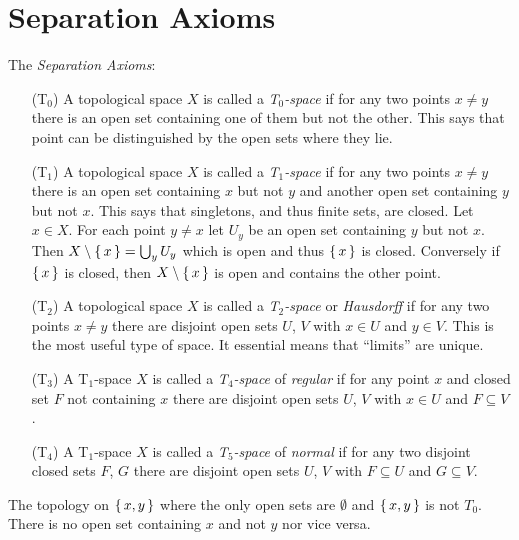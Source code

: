 \documentclass[letterpaper, 11pt]{article}
\begin{document}
\clearpage

\section{Separation Axioms}

\begin{defn}
  The \emph{Separation Axioms}:
  \begin{itemize}
  \item[(T$_{0}$)] A topological space $X$ is called a \emph{T$_{0}$-space} if for any two points $x \neq y$ there is an open set containing one of them but not the other.
                   This says that point can be distinguished by the open sets where they lie.
  \item[(T$_{1}$)] A topological space $X$ is called a \emph{T$_{1}$-space} if for any two points $x \neq y$ there is an open set containing $x$ but not $y$ and another open set containing $y$ but not $x$.
        This says that singletons, and thus finite sets, are closed.
        Let $x \in X$.
        For each point $y \neq x$ let $U_{y}$ be an open set containing $y$ but not $x$.
        Then $X \setminus \set{x} = \bigcup_{y} U_{y}$ which is open and thus $\set{x}$ is closed.
        Conversely if $\set{x}$ is closed, then $X \setminus \set{x}$ is open and contains the other point.
  \item[(T$_{2}$)] A topological space $X$ is called a \emph{T$_{2}$-space} or \emph{Hausdorff} if for any two points $x \neq y$ there are disjoint open sets $U$, $V$ with $x \in U$ and $y \in V$.
        This is the most useful type of space.
        It essential means that ``limits'' are unique.
  \item[(T$_{3}$)] A T$_{1}$-space $X$ is called a \emph{T$_{4}$-space} of \emph{regular} if for any point $x$ and closed set $F$ not containing $x$ there are disjoint open sets $U$, $V$ with $x \in U$ and $F \subseteq V$.
  \item[(T$_{4}$)] A T$_{1}$-space $X$ is called a \emph{T$_{5}$-space} of \emph{normal} if for any two disjoint closed sets $F$, $G$ there are disjoint open sets $U$, $V$ with $F \subseteq U$ and $G \subseteq V$.
  \end{itemize}
\end{defn}

\begin{ex}
  The topology on $\set{x, y}$ where the only open sets are $\emptyset$ and $\set{x, y}$ is not $T_{0}$.
  There is no open set containing $x$ and not $y$ nor vice versa.
\end{ex}
\end{document}
